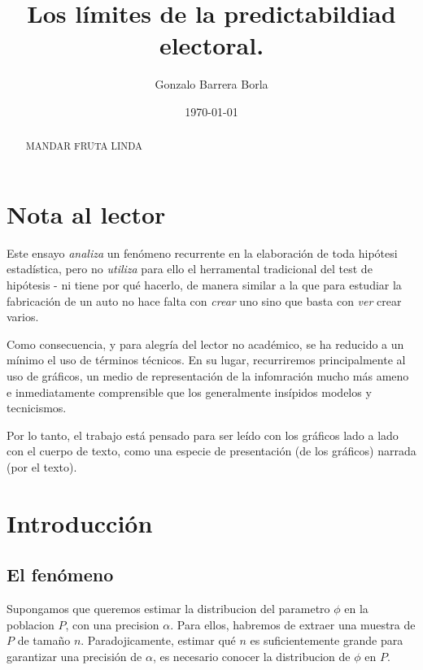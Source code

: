 \documentclass[12pt, a4paper]{article}
\begin{document}
\title{Los l\'imites de la predictabildiad electoral.}
\author{Gonzalo Barrera Borla}
\date{\today}

\maketitle

\pagebreak

\begin{abstract}
MANDAR FRUTA LINDA 
\end{abstract}

\pagebreak

\tableofcontents

\pagebreak

\section{Nota al lector}

Este ensayo \emph{analiza} un fen\'omeno recurrente en la elaboraci\'on de toda hip\'otesi estad\'istica, pero no \emph{utiliza} para ello el herramental tradicional del test de hip\'otesis - ni tiene por qu\'e hacerlo, de manera similar a la que para estudiar la fabricaci\'on de un auto no hace falta con \emph{crear} uno sino que basta con \emph{ver} crear varios.

Como consecuencia, y para alegr\'ia del lector no acad\'emico, se ha reducido a un m\'inimo el uso de t\'erminos t\'ecnicos. En su lugar, recurriremos principalmente al uso de gr\'aficos, un medio de representaci\'on de la infomraci\'on mucho m\'as ameno e inmediatamente comprensible que los generalmente ins\'ipidos modelos y tecnicismos.

Por lo tanto, el trabajo est\'a pensado para ser le\'ido con los gr\'aficos lado a lado con el cuerpo de texto, como una especie de presentaci\'on (de los gr\'aficos) narrada (por el texto).  

\pagebreak

\section{Introducci\'on}

\subsection{El fen\'omeno}

Supongamos que queremos estimar la distribucion del parametro $\phi$ en la poblacion $P$, con una precision $\alpha$. Para ellos, habremos de extraer una muestra de $P$ de tama\~no $n$. Paradojicamente, estimar qu\'e $n$ es suficientemente grande para garantizar una precisi\'on de $\alpha$, es necesario conocer la distribucion de $\phi$ en $P$.
\end{document}
